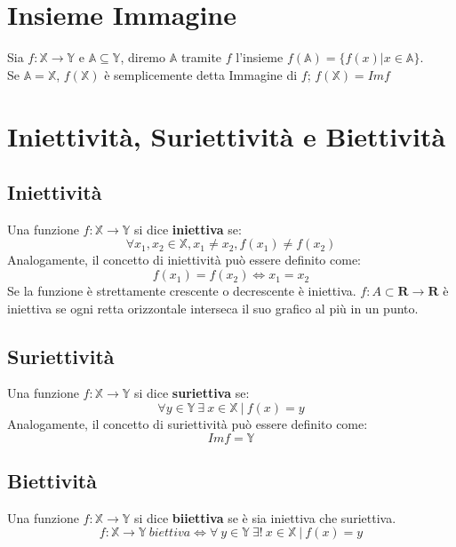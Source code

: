 \section{Insieme Immagine}
Sia $f: \mathbb{X} \rightarrow \mathbb{Y}$ e $\mathbb{A} \subseteq \mathbb{Y}$, diremo $\mathbb{A}$ tramite $f$ l'insieme $f(\mathbb{A}) = \{f(x) | x \in \mathbb{A}\}$.\\
Se $\mathbb{A} = \mathbb{X}$, $f(\mathbb{X})$ è semplicemente detta Immagine di $f$; $f(\mathbb{X}) = Imf$

\section{Iniettività, Suriettività e Biettività}
\subsection{Iniettività}
Una funzione $f: \mathbb{X} \rightarrow \mathbb{Y}$ si dice \textbf{iniettiva} se:
\begin{equation*}
\forall x_1,x_2 \in \mathbb{X}, x_1 \neq x_2, f(x_1) \neq f(x_2)
\end{equation*} 
Analogamente, il concetto di iniettività può essere definito come:
\begin{equation*}
f(x_1) = f(x_2) \iff x_1=x_2
\end{equation*}
Se la funzione \`e strettamente crescente o decrescente \`e iniettiva. $f:A \subset \mathbf{R}\rightarrow\mathbf{R}$ \`e iniettiva se ogni retta orizzontale interseca il suo 
grafico al pi\`u in un punto.
\subsection{Suriettività}
Una funzione $f: \mathbb{X} \rightarrow \mathbb{Y}$ si dice \textbf{suriettiva} se:
\begin{equation*}
\forall y \in \mathbb{Y}\ \exists\ x \in \mathbb{X}\ |\ f(x) = y
\end{equation*} 
Analogamente, il concetto di suriettività può essere definito come:
\begin{equation*}
Imf = \mathbb{Y}
\end{equation*}

\subsection{Biettività}
Una funzione $f: \mathbb{X} \rightarrow \mathbb{Y}$ si dice \textbf{biiettiva} se è sia iniettiva che suriettiva.
\begin{equation*}
f: \mathbb{X} \rightarrow \mathbb{Y}\ biettiva \iff \forall\ y \in \mathbb{Y}\ \exists !\ x \in \mathbb{X}\ |\ f(x)=y
\end{equation*}

